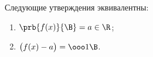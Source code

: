 \label{prbeq}
 	Следующие утверждения эквивалентны:
 	\begin{enumerate}
 	  \item $\prb{f(x)}{\B}=a\in\R$;
 	  \item $\big(f(x)-a\big)=\ooo1\B$.
 	\end{enumerate}
 